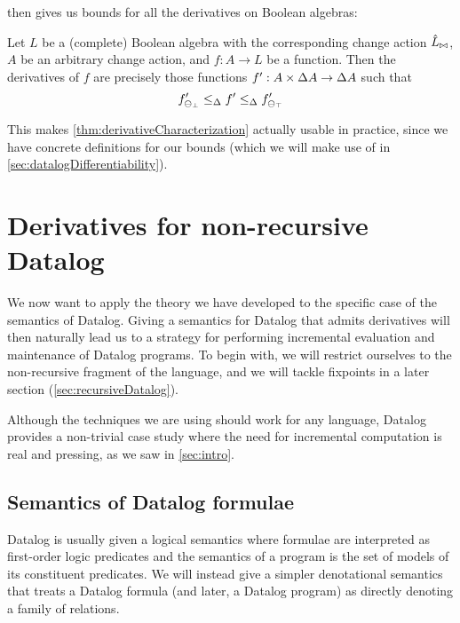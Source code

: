  then gives us bounds for
all the derivatives on Boolean algebras:

\begin{corollary}
\label{cor:booleanCharacterization}
  Let $L$ be a (complete) Boolean algebra with the corresponding change action
  $\hat{L}_{\bowtie}$, $A$ be an arbitrary change action, and $f: A \rightarrow
  L$ be a function. Then the derivatives of $f$ are precisely those functions
  $f': A \times \Delta A \rightarrow \Delta A$ such that
  \begin{displaymath}
    f'_{\ominus_{\bot}}
    \leq_\Delta
    f'
    \leq_\Delta
    f'_{\ominus_{\top}}
  \end{displaymath}
\end{corollary}

This makes \cref{thm:derivativeCharacterization} actually usable in practice, since
we have concrete definitions for our bounds (which we will make use of in \cref{sec:datalogDifferentiability}).

\section{Derivatives for non-recursive Datalog}
\label{sec:nonRecursiveDatalog}

We now want to apply the theory we have developed to the specific case of the semantics
of Datalog. Giving a semantics for Datalog that admits derivatives will then
naturally lead us to a strategy for performing incremental evaluation and maintenance of Datalog programs. 
To begin with, we will restrict ourselves to the non-recursive fragment of the language, and we will tackle
fixpoints in a later section (\cref{sec:recursiveDatalog}).

Although the techniques we are using should work for any language, Datalog
provides a non-trivial case study where the need for incremental computation is
real and pressing, as we saw in \cref{sec:intro}.

\subsection{Semantics of Datalog formulae}

Datalog is usually given a logical semantics where formulae are interpreted as first-order
logic predicates and the semantics of a program is the set of models of its constituent
predicates. We will instead give a simpler denotational semantics that treats a Datalog
formula (and later, a Datalog program) as directly denoting a family of relations.


